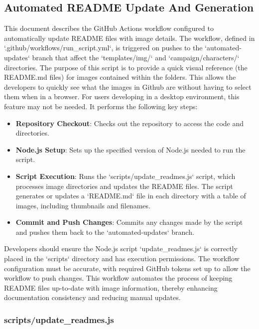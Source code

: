\subsection{Automated README Update And Generation}


This document describes the GitHub Actions workflow configured to automatically update README files with image details. The workflow, defined in `.github/workflows/run\_script.yml`, is triggered on pushes to the `automated-updates` branch that affect the `templates/img/` and `campaign/characters/` directories. The purpose of this script is to provide a quick visual reference (the README.md files) for images contained within the folders. This allows the developers to quickly see what the images in Github are without having to select them when in a browser. For users developing in a desktop environment, this feature may not be needed. It performs the following key steps:

\begin{itemize}
\item \textbf{Repository Checkout}: Checks out the repository to access the code and directories.
\item \textbf{Node.js Setup}: Sets up the specified version of Node.js needed to run the script.
\item \textbf{Script Execution}: Runs the `scripts/update\_readmes.js` script, which processes image directories and updates the README files. The script generates or updates a `README.md` file in each directory with a table of images, including thumbnails and filenames.
\item \textbf{Commit and Push Changes}: Commits any changes made by the script and pushes them back to the `automated-updates` branch.
\end{itemize}

Developers should ensure the Node.js script `update\_readmes.js` is correctly placed in the `scripts` directory and has execution permissions. The workflow configuration must be accurate, with required GitHub tokens set up to allow the workflow to push changes. This workflow automates the process of keeping README files up-to-date with image information, thereby enhancing documentation consistency and reducing manual updates.







\subsubsection{scripts/update\_readmes.js}

